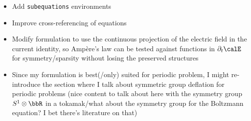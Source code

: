 {\begin{itemize}
        \item  Add {\tt subequations} environments
        \item  Improve cross-referencing of equations
        \item  Modify formulation to use the continuous projection of the electric field in the current identity, so Ampère's law can be tested against functions in $\partial_{t}\calE$ for symmetry/sparsity without losing the preserved structures
        \item  Since my formulation is best(/only) suited for periodic problem, I might re-introduce the section where I talk about symmetric group deflation for periodic problems (nice content to talk about here with the symmetry group $S^{1}\otimes\bbR$ in a tokamak/what about the symmetry group for the Boltzmann equation? I bet there's literature on that)
    \end{itemize}}
